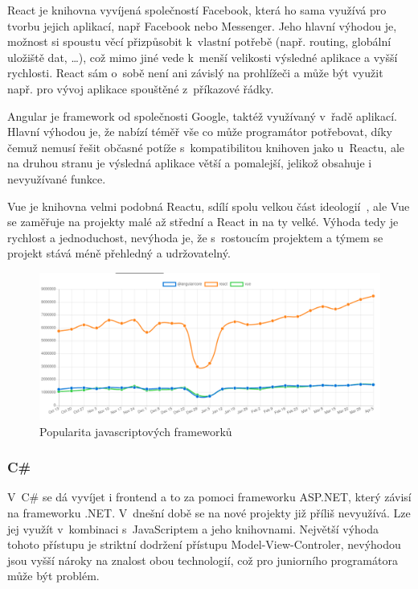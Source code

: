 React je knihovna vyvíjená společností Facebook, která ho sama využívá pro tvorbu jejich aplikací, např Facebook nebo Messenger. Jeho hlavní výhodou je, možnost si spoustu věcí přizpůsobit k~vlastní potřebě (např. routing, globální uložiště dat, \ldots{}), což mimo jiné vede k~menší velikosti výsledné aplikace a vyšší rychlosti. React sám o~sobě není ani závislý na prohlížeči a může být využit např. pro vývoj aplikace spouštěné z~příkazové řádky.

Angular je framework od společnosti Google, taktéž využívaný v~řadě aplikací. Hlavní výhodou je, že nabízí téměř vše co může programátor potřebovat, díky čemuž nemusí řešit občasné potíže s~kompatibilitou knihoven jako u~Reactu, ale na druhou stranu je výsledná aplikace větší a pomalejší, jelikož obsahuje i nevyužívané funkce.

Vue je knihovna velmi podobná Reactu, sdílí spolu velkou část ideologií~\cite{you_2014_comparison}, ale Vue se zaměřuje na projekty malé až střední a React in na ty velké. Výhoda tedy je rychlost a jednoduchost, nevýhoda je, že s~rostoucím projektem a týmem se projekt stává méně přehledný a udržovatelný.

\begin{figure}[h!]
    \centering
    \includegraphics[width=\textwidth]{assets/popularity_plot.png}
    \caption{Popularita javascriptových frameworků \cite{potter_2020_npm}}
    \label{fig:popularity_plot}
\end{figure}

\subsubsection*{C\# }
V~C\# se dá vyvíjet i frontend a to za pomoci frameworku ASP.NET, který závisí na frameworku .NET. V~dnešní době se na nové projekty již příliš nevyužívá. Lze jej využít v~kombinaci s~JavaScriptem a jeho knihovnami. Největší výhoda tohoto přístupu je striktní dodržení přístupu Model-View-Controler, nevýhodou jsou vyšší nároky na znalost obou technologií, což pro juniorního programátora může být problém.

